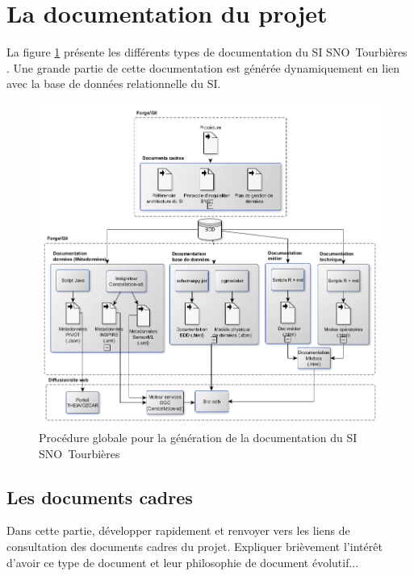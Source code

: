 \documentclass[]{article}
\newcommand{\SNOT}{{SNO~Tourbières }}
\begin{document}
\section{La documentation du projet}

La figure \ref{Procedure_documentation} présente les différents types de documentation du SI \SNOT. Une grande partie de cette documentation est générée dynamiquement en lien avec la base de données relationnelle du SI.

\begin{figure}[htbp]
	\begin{center}
		\includegraphics[width=14cm]{Diagramme_documentation.png}
		\caption{Procédure globale pour la génération de la documentation du SI \SNOT}
		\label{Procedure_documentation}		
	\end{center}
\end{figure}

\subsection{Les documents cadres}

Dans cette partie, développer rapidement et renvoyer vers les liens de consultation des documents cadres du projet. Expliquer brièvement l'intérêt d'avoir ce type de document et leur philosophie de document évolutif...
\end{document}
